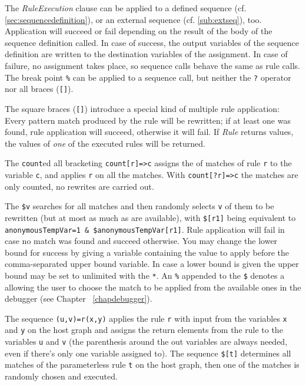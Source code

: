 The \emph{RuleExecution} clause can be applied to a defined sequence (cf. \ref{sec:sequencedefinition}), or an external sequence (cf. \ref{sub:extseq}), too.
Application will succeed or fail depending on the result of the body of the sequence definition called.
In case of success, the output variables of the sequence definition are written to the destination variables of the assignment. In case of failure, no assignment takes place, so sequence calls behave the same as rule calls.
The break point \texttt{\%} can be applied to a sequence call, but neither the \texttt{?} operator nor all braces (\texttt{[]}).

The square braces (\texttt{[]}) introduce a special kind of multiple rule application:
Every pattern match produced by the rule will be rewritten;
if at least one was found, rule application will succeed, otherwise it will fail. 
If \emph{Rule} returns values, the values of \emph{one} of the executed rules will be returned.

The \texttt{count}ed all bracketing \texttt{count[r]=>c} assigns the  of matches of rule \texttt{r} to the variable \texttt{c}, and applies \texttt{r} on all the matches.
With \texttt{count[?r]=>c} the matches are only counted, no rewrites are carried out.

The  \texttt{\$v} searches for all matches and then randomly selects \texttt{v} of them to be rewritten (but at most as much as are available), with \texttt{\$[r1]} being equivalent to \texttt{anonymousTempVar=1 \& \$anonymousTempVar[r1]}.
Rule application will fail in case no match was found and succeed otherwise. 
You may change the lower bound for success by giving a variable containing the value to apply before the comma-separated upper bound variable.
In case a lower bound is given the upper bound may be set to unlimited with the \texttt{*}.
An \texttt{\%} appended to the \texttt{\$} denotes a  
allowing the user to choose the match to be applied from the available ones in the debugger (see Chapter ~\ref{chapdebugger}).

\begin{example}
The sequence \verb#(u,v)=r(x,y)# applies the rule \texttt{r} with input from the variables \texttt{x} and \texttt{y} on the host graph 
and assigns the return elements from the rule to the variables \texttt{u} and \texttt{v} (the parenthesis around the out variables are always needed, even if there's only one variable assigned to).
The sequence \verb#$[t]# determines all matches of the parameterless rule \texttt{t} on the host graph, then one of the matches is randomly chosen and executed.
\end{example}


